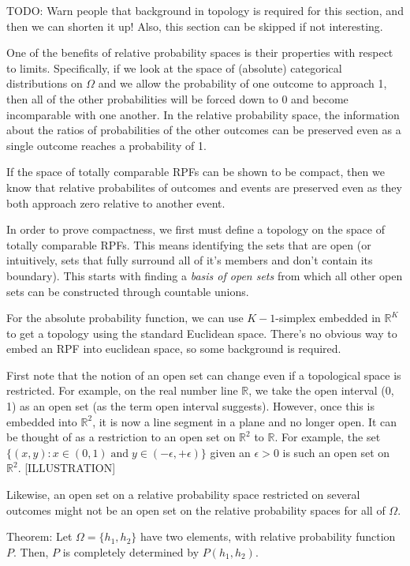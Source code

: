 \documentclass[twoside]{article}
\begin{document}
TODO: Warn people that background in topology is required for this section, and then we can shorten it up! Also, this section can be skipped if not interesting.

One of the benefits of relative probability spaces is their properties with respect to limits. Specifically, if we look at the space of (absolute) categorical distributions on \(\Omega\) and we allow the probability of one outcome to approach 1, then all of the other probabilities will be forced down to 0 and become incomparable with one another. In the relative probability space, the information about the ratios of probabilities of the other outcomes can be preserved even as a single outcome reaches a probability of 1.

If the space of totally comparable RPFs can be shown to be compact, then we know that relative probabilites of outcomes and events are preserved even as they both approach zero relative to another event.

In order to prove compactness, we first must define a topology on the space of totally comparable RPFs. This means identifying the sets that are open (or intuitively, sets that fully surround all of it's members and don't contain its boundary). This starts with finding a \textit{basis of open sets} from which all other open sets can be constructed through countable unions.

For the absolute probability function, we can use \(K-1\)-simplex embedded in \(\mathbb{R}^K\) to get a topology using the standard Euclidean space. There's no obvious way to embed an RPF into euclidean space, so some background is required.

First note that the notion of an open set can change even if a topological space is restricted. For example, on the real number line \(\mathbb{R}\), we take the open interval (0, 1) as an open set (as the term open interval suggests). However, once this is embedded into \(\mathbb{R}^2\), it is now a line segment in a plane and no longer open. It can be thought of as a restriction to an open set on \(\mathbb{R}^2\) to \(\mathbb{R}\). For example, the set \(\{(x, y): x \in (0, 1)\;  \text{and}\;  y \in (-\epsilon, +\epsilon)\}\) given an \(\epsilon > 0\) is such an open set on \(\mathbb{R}^2\). [ILLUSTRATION]

Likewise, an open set on a relative probability space restricted on several outcomes might not be an open set on the relative probability spaces for all of \(\Omega\).

Theorem: Let \(\Omega = \{h_1, h_2\}\) have two elements, with relative probability function \(P\). Then, \(P\) is completely determined by \(P(h_1, h_2)\).
\end{document}
